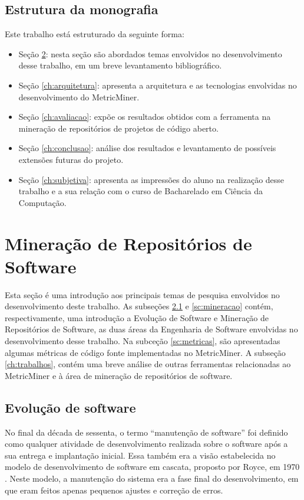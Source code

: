 \documentclass[a4paper, 12pt, twoside]{book}
\begin{document}
    \section{Estrutura da monografia}
        Este trabalho está estruturado da seguinte forma: 
        \begin{itemize}
            \item Seção \ref{ch:conceitos}: nesta seção são abordados temas 
                envolvidos no desenvolvimento desse trabalho, em um breve levantamento bibliográfico.
            \item Seção \ref{ch:arquitetura}: apresenta a arquitetura e as tecnologias
            envolvidas no desenvolvimento do MetricMiner.
            \item Seção \ref{ch:avaliacao}: expõe os resultados obtidos com a ferramenta 
                na mineração de repositórios de projetos de código aberto.
            \item Seção \ref{ch:conclusao}: análise dos resultados e levantamento 
                de possíveis extensões futuras do projeto.
            \item Seção \ref{ch:subjetiva}: apresenta as impressões do aluno na realização 
                desse trabalho e a sua relação com o curso de Bacharelado em Ciência da Computação.
        \end{itemize}
    
\chapter{Mineração de Repositórios de Software} \label{ch:conceitos}
    Esta seção é uma introdução aos principais temas de pesquisa envolvidos no desenvolvimento
    deste trabalho. As subseções \ref{sc:evolucao} e \ref{sc:mineracao} contém, respectivamente, 
    uma introdução a Evolução de Software e Mineração de Repositórios de Software, as duas áreas 
    da Engenharia de Software envolvidas no desenvolvimento desse trabalho. Na subceção 
    \ref{sc:metricas}, são apresentadas algumas métricas de código fonte implementadas no 
    MetricMiner. A subseção \ref{ch:trabalhos}, contém uma breve análise de outras ferramentas
    relacionadas ao MetricMiner e à área de mineração de repositórios de software.

    \section{Evolução de software} \label{sc:evolucao}
        No final da década de sessenta, o termo ``manutenção de software'' foi definido 
        como qualquer atividade de desenvolvimento realizada sobre o software após a sua
        entrega e implantação inicial. Essa também era a visão estabelecida no modelo de
        desenvolvimento de software em cascata, proposto por Royce, em 1970 
        \cite{DBLP:series/springer/Mens08}. Neste modelo, a manutenção do sistema era a fase final do 
        desenvolvimento, em que eram feitos apenas pequenos ajustes e correção de erros.
        
\end{document}
